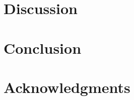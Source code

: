 \documentclass[journal,draftclsnofoot,onecolumn]{IEEEtran}
\begin{document}
\section{Discussion}
\label{sec:discussion}


\section{Conclusion}
\label{sec:conclusion}


\section*{Acknowledgments}


\ifCLASSOPTIONcaptionsoff
  \newpage
\fi

%








\end{document}
